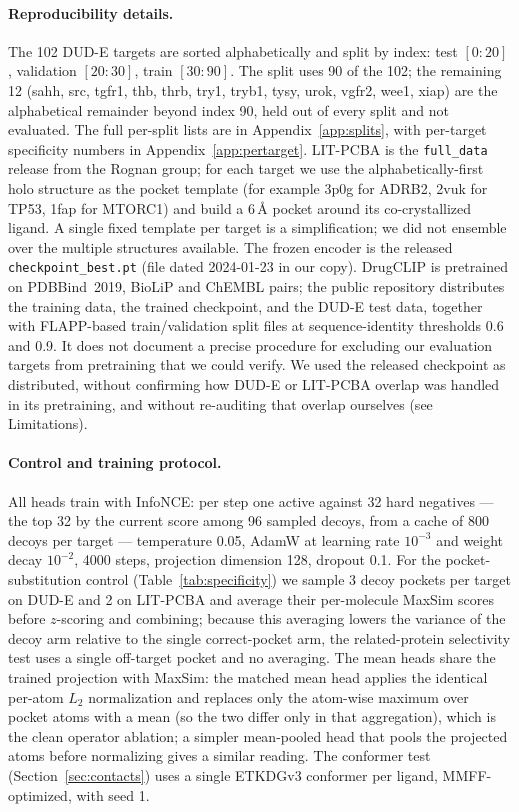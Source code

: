 \documentclass[10pt,letterpaper,twocolumn]{article}
\begin{document}
\paragraph{Reproducibility details.} The 102 DUD-E targets are sorted alphabetically and split by index: test $[0{:}20]$, validation $[20{:}30]$, train $[30{:}90]$. The split uses 90 of the 102; the remaining 12 (sahh, src, tgfr1, thb, thrb, try1, tryb1, tysy, urok, vgfr2, wee1, xiap) are the alphabetical remainder beyond index 90, held out of every split and not evaluated. The full per-split lists are in Appendix~\ref{app:splits}, with per-target specificity numbers in Appendix~\ref{app:pertarget}. LIT-PCBA is the \texttt{full\_data} release from the Rognan group; for each target we use the alphabetically-first holo structure as the pocket template (for example 3p0g for ADRB2, 2vuk for TP53, 1fap for MTORC1) and build a 6\,\AA{} pocket around its co-crystallized ligand. A single fixed template per target is a simplification; we did not ensemble over the multiple structures available. The frozen encoder is the released \texttt{checkpoint\_best.pt} (file dated 2024-01-23 in our copy). DrugCLIP is pretrained on PDBBind~2019, BioLiP and ChEMBL pairs; the public repository distributes the training data, the trained checkpoint, and the DUD-E test data, together with FLAPP-based train/validation split files at sequence-identity thresholds 0.6 and 0.9. It does not document a precise procedure for excluding our evaluation targets from pretraining that we could verify. We used the released checkpoint as distributed, without confirming how DUD-E or LIT-PCBA overlap was handled in its pretraining, and without re-auditing that overlap ourselves (see Limitations).

\paragraph{Control and training protocol.} All heads train with InfoNCE: per step one active against 32 hard negatives --- the top 32 by the current score among 96 sampled decoys, from a cache of 800 decoys per target --- temperature 0.05, AdamW at learning rate $10^{-3}$ and weight decay $10^{-2}$, 4000 steps, projection dimension 128, dropout 0.1. For the pocket-substitution control (Table~\ref{tab:specificity}) we sample 3 decoy pockets per target on DUD-E and 2 on LIT-PCBA and average their per-molecule MaxSim scores before $z$-scoring and combining; because this averaging lowers the variance of the decoy arm relative to the single correct-pocket arm, the related-protein selectivity test uses a single off-target pocket and no averaging. The mean heads share the trained projection with MaxSim: the matched mean head applies the identical per-atom $L_2$ normalization and replaces only the atom-wise maximum over pocket atoms with a mean (so the two differ only in that aggregation), which is the clean operator ablation; a simpler mean-pooled head that pools the projected atoms before normalizing gives a similar reading. The conformer test (Section~\ref{sec:contacts}) uses a single ETKDGv3 conformer per ligand, MMFF-optimized, with seed 1.
\end{document}
